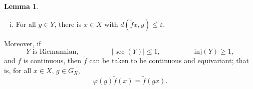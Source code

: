 \documentclass[12pt]{amsart}
\theoremstyle{definition}
\def\fnum{equation}
\newtheorem{lemma}[\fnum]{Lemma}
\numberwithin{equation}{section}
\newcommand{\inj}{{\text{inj}}}
\begin{document}
\begin{lemma}
\begin{enumerate}[i.]
     \[   \vert d ( \tilde {f} (x_1) \tilde{f} (x_2) ) - d(x_1, x_2) \vert \leq \varepsilon.     \] \label{conclusion:f-tilde-1}
     \item  For all $y \in Y$, there is $x \in X$ with $d ( \tilde{f} x , y ) \leq \varepsilon$.\label{conclusion:f-tilde-2}
 \end{enumerate}
 Moreover, if  
 \begin{equation}\label{condition:riemannian-sec-inj}
  Y\text{ is Riemannian,} \hspace{2cm} \vert \sec (Y) \vert \leq 1,   \hspace{2cm}  \inj (Y) \geq 1,   
 \end{equation}
   and $f $ is continuous, then $\tilde{f}$ can be taken to be continuous and equivariant; that is, for all $x \in X$, $g \in G_X$, 
 \begin{equation*}
 \varphi (g) \tilde{f} (x) = \tilde{f} (gx) .  
 \end{equation*}
\end{lemma}
\end{document}

